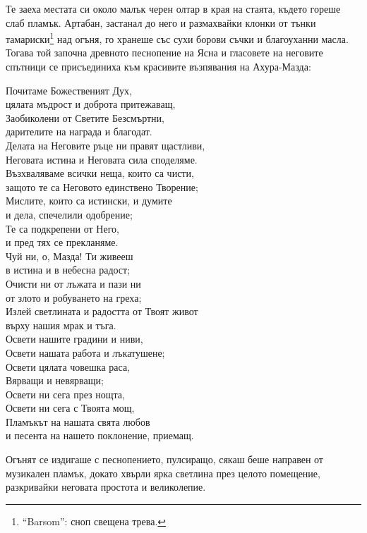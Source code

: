 \documentclass[oneside,10pt]{memoir}
\begin{document}
Те заеха местата си около малък черен олтар в края на стаята, където гореше слаб
пламък. Артабан, застанал до него и размахвайки клонки от тънки
тамариски\footnote{``Barsom'': сноп свещена трева.} над огъня, го хранеше със
сухи борови съчки и благоуханни масла. Тогава той започна древното песнопение на
Ясна и гласовете на неговите спътници се присъединиха към красивите възпявания
на Ахура-Мазда:
\begin{center}
\fontsize{8}{10}\selectfont
\setlength{\leftskip}{1cm}
Почитаме Божественият Дух, \\
цялата мъдрост и доброта притежаващ, \\
Заобиколени от Светите Безсмъртни, \\
дарителите на награда и благодат. \\
Делата на Неговите ръце ни правят щастливи, \\
Неговата истина и Неговата сила споделяме. \\
Възхваляваме всички неща, които са чисти, \\
защото те са Неговото единствено Творение; \\
Мислите, които са истински, и думите \\
и дела, спечелили одобрение; \\
Те са подкрепени от Него, \\
и пред тях се прекланяме. \\
Чуй ни, о, Мазда! Ти живееш \\
в истина и в небесна радост; \\
Очисти ни от лъжата и пази ни \\
от злото и робуването на греха; \\
Излей светлината и радостта от Твоят живот \\
върху нашия мрак и тъга. \\
Освети нашите градини и ниви, \\
Освети нашата работа и лъкатушене; \\
Освети цялата човешка раса, \\
Вярващи и невярващи; \\
Освети ни сега през нощта, \\
Освети ни сега с Твоята мощ, \\
Пламъкът на нашата свята любов \\
и песента на нашето поклонение, приемащ.
\end{center}

Огънят се издигаше с песнопението, пулсиращо, сякаш беше направен от музикален
пламък, докато хвърли ярка светлина през целото помещение, разкривайки неговата
простота и великолепие.
\end{document}
